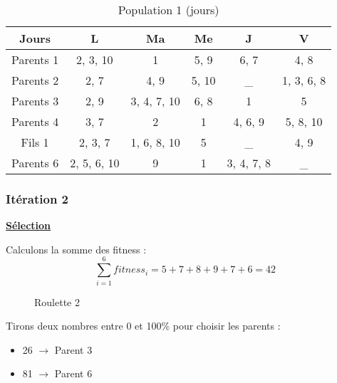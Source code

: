 \newpage

\begin{table}[!h]
    \centering
    \begin{tabular}{|c|c|c|c|c|c|}
        \hline
        Jours     & L           & Ma          & Me    & J          & V          \\
        \hline
        Parents 1 & 2, 3, 10    & 1           & 5, 9  & 6, 7       & 4, 8       \\
        \hline
        Parents 2 & 2, 7        & 4, 9        & 5, 10 & \_         & 1, 3, 6, 8 \\
        \hline
        Parents 3 & 2, 9        & 3, 4, 7, 10 & 6, 8  & 1          & 5          \\
        \hline
        Parents 4 & 3, 7        & 2           & 1     & 4, 6, 9    & 5, 8, 10   \\
        \hline
        Fils 1    & 2, 3, 7     & 1, 6, 8, 10 & 5     & \_         & 4, 9       \\
        \hline
        Parents 6 & 2, 5, 6, 10 & 9           & 1     & 3, 4, 7, 8 & \_         \\
        \hline
    \end{tabular}
    \caption{Population 1 (jours)}\label{tab:population-1-jours}
\end{table}

\subsubsection{Itération 2}

\textbf{\underline{Sélection}}

Calculons la somme des fitness :
\begin{equation}
    \sum_{i=1}^6 fitness_i = 5 + 7 + 8 + 9 + 7 + 6 = 42
\end{equation}

\begin{figure}[!h]
    \centering
    \caption{Roulette 2}\label{fig:roulette-2}
\end{figure}

Tirons deux nombres entre 0 et 100\% pour choisir les parents :
\begin{itemize}
    \item 26 $\rightarrow$ Parent 3
    \item 81 $\rightarrow$ Parent 6
\end{itemize}

